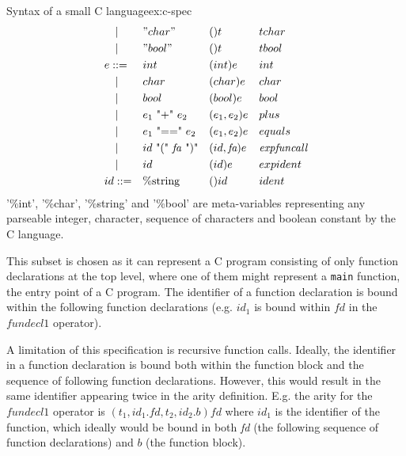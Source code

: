 \documentclass{article}
\begin{document}
\begin{example}{Syntax of a small C language}{ex:c-spec}
\[\begin{aligned}
&\quad |    &   & "char"&                                           &()t        &                   &tchar              \\
&\quad |    &   & "bool"&                                           &()t        &                   &tbool              \\
&e ::=      &   & int&                                              &(int)e        &                &int                \\
&\quad |    &   & char&                                             &(char)e        &               &char               \\
&\quad |    &   & bool&                                             &(bool)e        &               &bool               \\
&\quad |    &   & \text{$e_1$ "+" $e_2$}               &            &(e_1,e_2)e  &                  &plus               \\
&\quad |    &   & \text{$e_1$ "==" $e_2$}               &           &(e_1,e_2)e  &                  &equals               \\
&\quad |    &   & \text{$id$ "(" \textit{fa} ")"}&                  &(id,\textit{fa})e&             &\textit{expfuncall}             \\
&\quad |    &   & \text{$id$}&                                      &(id)e&                         &expident             \\
&id ::=     &   & \%\text{string}&                                  &()id        &                  &ident              \\
\end{aligned}
\]
'\%int', '\%char', '\%string' and '\%bool' are meta-variables representing any parseable integer, character, sequence of characters and boolean constant by the C language.

This subset is chosen as it can represent a C program consisting of only function declarations at the top level, where one of them might represent a \texttt{main} function, the entry point of a C program. The identifier of a function declaration is bound within the following function declarations (e.g. $id_1$ is bound within $\textit{fd}$ in the $\textit{fundecl1}$ operator).

A limitation of this specification is recursive function calls. Ideally, the identifier in a function declaration is bound both within the function block and the sequence of following function declarations. However, this would result in the same identifier appearing twice in the arity definition. E.g. the arity for the $\textit{fundecl1}$ operator is $(t_1,id_1.\textit{fd},t_2,id_2.b)fd$ where $id_1$ is the identifier of the function, which ideally would be bound in both \textit{fd} (the following sequence of function declarations) and $b$ (the function block). 


\end{example}
\end{document}
